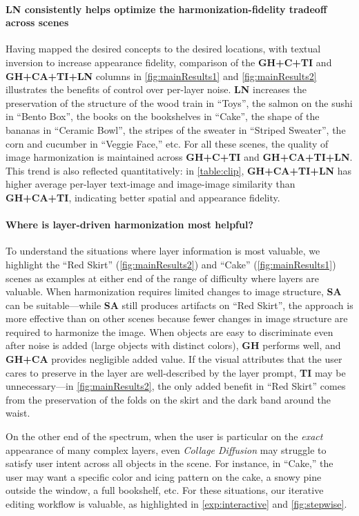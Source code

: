 \paragraph{LN consistently helps optimize the harmonization-fidelity tradeoff across scenes}
Having mapped the desired concepts to the desired locations, with textual inversion to increase appearance fidelity, comparison of the \textbf{GH+C+TI} and \textbf{GH+CA+TI+LN} columns in \cref{fig:mainResults1} and \ref{fig:mainResults2} illustrates the benefits of control over per-layer noise.
\textbf{LN} increases the preservation of the structure of the wood train in ``Toys'', the salmon on the sushi in ``Bento Box'', the books on the bookshelves in ``Cake'', the shape of the bananas in ``Ceramic Bowl'', the stripes of the sweater in ``Striped Sweater'', the corn and cucumber in ``Veggie Face,'' etc. For all these scenes, the quality of image harmonization is maintained across \textbf{GH+C+TI} and \textbf{GH+CA+TI+LN}. 
This trend is also reflected quantitatively: in \cref{table:clip}, \textbf{GH+CA+TI+LN} has higher average per-layer text-image and image-image similarity than \textbf{GH+CA+TI}, indicating better spatial and appearance fidelity. 
\vspace{-1.0em}
\paragraph{Where is layer-driven harmonization most helpful?} 
To understand the situations where layer information is most valuable,
we highlight the ``Red Skirt'' (\cref{fig:mainResults2}) and ``Cake'' (\cref{fig:mainResults1}) scenes as examples at either end of the range of difficulty where layers are valuable. 
When harmonization requires limited changes to image structure, \textbf{SA} can be suitable---while \textbf{SA} still produces artifacts on ``Red Skirt'', the approach is more effective than on other scenes because fewer changes in image structure are required to harmonize the image. 
When objects are easy to discriminate even after noise is added (large objects with distinct colors), \textbf{GH} performs well, and \textbf{GH+CA} provides negligible added value.
If the visual attributes that the user cares to preserve in the layer are well-described by the layer prompt, \textbf{TI} may be unnecessary---in \cref{fig:mainResults2}, the only added benefit in ``Red Skirt'' comes from the preservation of the folds on the skirt and the dark band around the waist.

On the other end of the spectrum, when the user is particular on the \emph{exact} appearance of many complex layers, even \textit{Collage Diffusion} may struggle to satisfy user intent across all objects in the scene. For instance, in ``Cake,'' the user may want a specific color and icing pattern on the cake, a snowy pine outside the window, a full bookshelf, etc. For these situations, our iterative editing workflow is valuable, as highlighted in \cref{exp:interactive} and \cref{fig:stepwise}.
\vspace{-0.5em}
